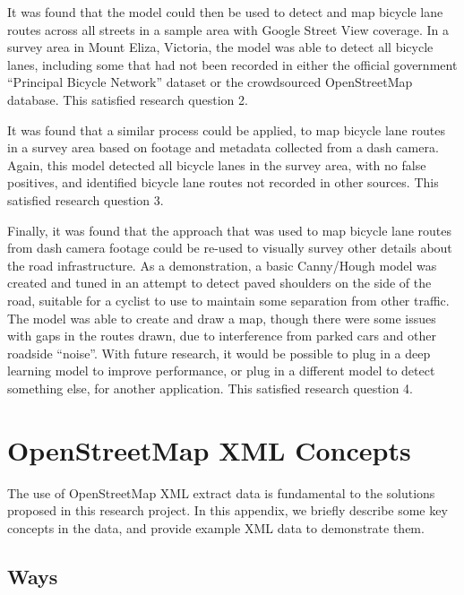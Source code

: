 \documentclass[11pt,twoside]{report}
\begin{document}
It was found that the model could then be used to detect and map bicycle lane routes across all streets in a sample area with Google Street View coverage.  In a survey area in Mount Eliza, Victoria, the model was able to detect all bicycle lanes, including some that had not been recorded in either the official government ``Principal Bicycle Network'' dataset or the crowdsourced OpenStreetMap database.  This satisfied research question 2.

It was found that a similar process could be applied, to map bicycle lane routes in a survey area based on footage and metadata collected from a dash camera.  Again, this model detected all bicycle lanes in the survey area, with no false positives, and identified bicycle lane routes not recorded in other sources.  This satisfied research question 3.

Finally, it was found that the approach that was used to map bicycle lane routes from dash camera footage could be re-used to visually survey other details about the road infrastructure.  As a demonstration, a basic Canny/Hough model was created and tuned in an attempt to detect paved shoulders on the side of the road, suitable for a cyclist to use to maintain some separation from other traffic.  The model was able to create and draw a map, though there were some issues with gaps in the routes drawn, due to interference from parked cars and other roadside ``noise''.  With future research, it would be possible to plug in a deep learning model to improve performance, or plug in a different model to detect something else, for another application.  This satisfied research question 4.


\appendix

\chapter{OpenStreetMap XML Concepts}
\label{a:osm_concepts}

The use of OpenStreetMap XML extract data is fundamental to the solutions proposed in this research project.  In this appendix, we briefly describe some key concepts in the data, and provide example XML data to demonstrate them.

\section{Ways}
\label{osm:ways}
\end{document}
